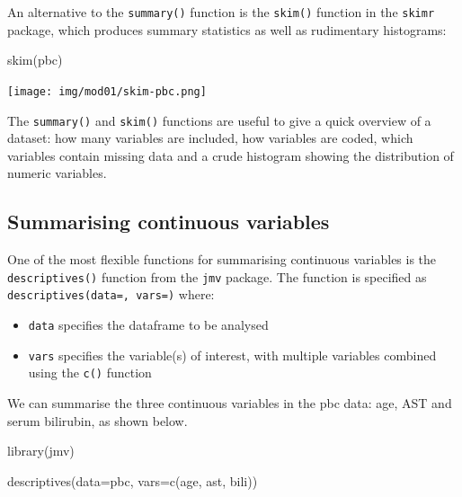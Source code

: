 \documentclass[
  a4paper,
]{memoir}
\newenvironment{Shaded}{\begin{snugshade}}{\end{snugshade}}
\newcommand{\AttributeTok}[1]{\textcolor[rgb]{0.00,0.00,0.00}{#1}}
\newcommand{\FunctionTok}[1]{\textcolor[rgb]{0.00,0.00,0.00}{#1}}
\newcommand{\NormalTok}[1]{\textcolor[rgb]{0.00,0.00,0.00}{#1}}
\providecommand{\tightlist}{%
  \setlength{\itemsep}{0pt}\setlength{\parskip}{0pt}}\usepackage{longtable,booktabs,array}
\begin{document}
\begin{tcolorbox}
An alternative to the \texttt{summary()} function is the \texttt{skim()}
function in the \texttt{skimr} package, which produces summary
statistics as well as rudimentary histograms:

\begin{Shaded}
\begin{Highlighting}[]
\FunctionTok{skim}\NormalTok{(pbc)}
\end{Highlighting}
\end{Shaded}

\texttt{[image: img/mod01/skim-pbc.png]}

\end{tcolorbox}

The \texttt{summary()} and \texttt{skim()} functions are useful to give
a quick overview of a dataset: how many variables are included, how
variables are coded, which variables contain missing data and a crude
histogram showing the distribution of numeric variables.

\hypertarget{summarising-continuous-variables-1}{%
\subsection{Summarising continuous
variables}\label{summarising-continuous-variables-1}}

One of the most flexible functions for summarising continuous variables
is the \texttt{descriptives()} function from the \texttt{jmv} package.
The function is specified as \texttt{descriptives(data=,\ vars=)} where:

\begin{itemize}
\tightlist
\item
  \texttt{data} specifies the dataframe to be analysed
\item
  \texttt{vars} specifies the variable(s) of interest, with multiple
  variables combined using the \texttt{c()} function
\end{itemize}

We can summarise the three continuous variables in the pbc data: age,
AST and serum bilirubin, as shown below.

\begin{Shaded}
\begin{Highlighting}[]
\FunctionTok{library}\NormalTok{(jmv)}

\FunctionTok{descriptives}\NormalTok{(}\AttributeTok{data=}\NormalTok{pbc, }\AttributeTok{vars=}\FunctionTok{c}\NormalTok{(age, ast, bili))}
\end{Highlighting}
\end{Shaded}
\end{document}
